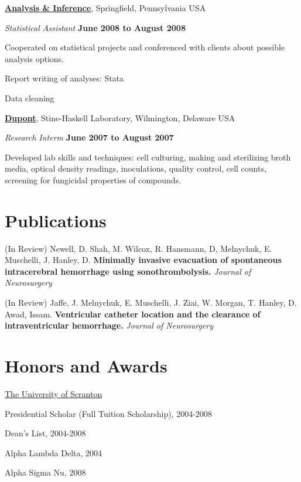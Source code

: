 \documentclass[11pt,a4paper]{moderncv}
\begin{document}
\href{http://www.analysisandinference.com/}{\textbf{Analysis \& Inference}},
Springfield, Pennsylvania USA
\begin{outerlist}

\item[] \textit{Statistical Assistant}%
        \hfill \textbf{June 2008 to August 2008}
\begin{innerlist}
\item Cooperated on statistical projects and conferenced with clients about possible analysis options.
\item Report writing of analyses: Stata
\item Data cleaning
\end{innerlist}

\end{outerlist}



\textbf{\href{http://www.dupont.com}{Dupont}},
Stine-Haskell Laboratory, Wilmington, Delaware USA
\begin{outerlist}
\item[] \textit{Research Interm}%
        \hfill \textbf{June 2007 to August 2007}
\begin{innerlist}
\item Developed lab skills and techniques: cell culturing, making and sterilizing broth media, optical density readings, inoculations, quality control, cell counts, screening for fungicidal properties of compounds.
\end{innerlist}

\end{outerlist}


\section{ Publications}
(In Review)  Newell, D. Shah, M. Wilcox, R. Hansmann, D, Melnychuk, E. Muschelli, J. Hanley, D. \textbf{Minimally invasive evacuation of spontaneous intracerebral hemorrhage using sonothrombolysis.} \emph{Journal of Neurosurgery}



(In Review) Jaffe, J.  Melnychuk, E. Muschelli, J. Ziai, W. Morgan, T.  Hanley, D.  Awad, Issam. \textbf{Ventricular catheter location and the clearance of intraventricular hemorrhage.}  \emph{Journal of Neurosurgery}


\section{ Honors and Awards}
%
\href{http://www.scranton.edu}{The University of Scranton}
\begin{innerlist}
\item Presidential Scholar (Full Tuition Scholarship), 2004-2008
\item Dean's List, 2004-2008
\item Alpha Lambda Delta, 2004
\item Alpha Sigma Nu, 2008

\end{innerlist}
\end{document}
